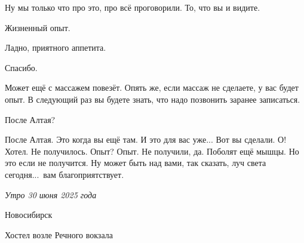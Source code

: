 \A
Ну мы только что про это, про всё проговорили. То, что вы и видите.

\I
Жизненный опыт.

\A
Ладно, приятного аппетита.

\I
Спасибо.

\A
Может ещё с массажем повезёт.
Опять же, если массаж не сделаете, у вас будет опыт.
В следующий раз вы будете знать, что надо позвонить заранее записаться.

\I
После Алтая?

\A
После Алтая.
Это когда вы ещё там.
И это для вас уже...
Вот вы сделали.
О! Хотел. Не получилось.
Опыт?
Опыт.
Не получили, да.
Поболят ещё мышцы.
Но это если не получится.
Ну может быть над вами,
так сказать, луч света сегодня...\
вам благоприятствует.

\kern2cm
\it
\lineskip=7pt
\hskip6cm Утро 30 июня 2025 года \par
\hskip5.1cm Новосибирск \par
\hskip4cm Хостел возле Речного вокзала \par
\vfil
\eject
\shipout\vbox{}
\bye
